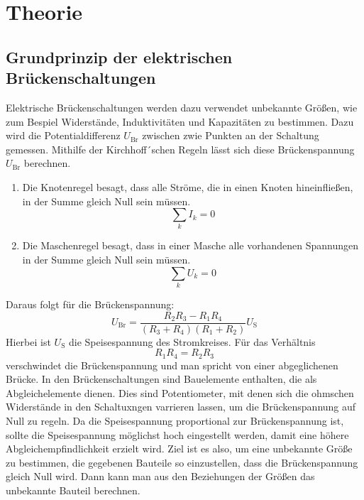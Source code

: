 \section{Theorie} \label{sec:Theorie}

\subsection{Grundprinzip der elektrischen Brückenschaltungen}

   Elektrische Brückenschaltungen werden dazu verwendet unbekannte Größen, wie zum Bespiel Widerstände, Induktivitäten und
   Kapazitäten zu bestimmen.
   Dazu wird die Potentialdifferenz $U_\text{Br}$ zwischen zwie Punkten an der Schaltung gemessen.
   Mithilfe der Kirchhoff´schen Regeln lässt sich diese Brückenspannung $U_\text{Br}$ berechnen.
   \begin{enumerate}
       \item Die Knotenregel besagt, dass alle Ströme, die in einen Knoten hineinfließen, in der Summe gleich Null sein müssen.
       \begin{equation}
           \sum_k I_k = 0
       \end{equation}
       \item Die Maschenregel besagt, dass in einer Masche alle vorhandenen Spannungen in der Summe gleich Null sein müssen.
       \begin{equation}
           \sum_k U_k = 0
       \end{equation}
   \end{enumerate}
   Daraus folgt für die Brückenspannung:
   \begin{equation}
       U_\text{Br} = \frac{R_2R_3 - R_1R_4}{(R_3 + R_4)(R_1 + R_2)} U_\text{S}
   \end{equation}
   Hierbei ist $U_\text{S}$ die Speisespannung des Stromkreises.
   Für das Verhältnis
   \begin{equation}
       R_1R_4 = R_2R_3 \label{eqn: Widerstände}
   \end{equation}
   verschwindet die Brückenspannung und man spricht von einer abgeglichenen Brücke.
   In den Brückenschaltungen sind Bauelemente enthalten, die als Abgleichelemente dienen.
   Dies sind Potentiometer, mit denen sich die ohmschen Widerstände in den Schaltuxngen varrieren lassen, um
   die Brückenspannung auf Null zu regeln.
   Da die Speisespannung proportional zur Brückenspannung ist, sollte die Speisespannung möglichst hoch eingestellt werden,
   damit eine höhere Abgleichempfindlichkeit erzielt wird.
   Ziel ist es also, um eine unbekannte Größe zu bestimmen, die gegebenen Bauteile so einzustellen, dass
   die Brückenspannung gleich Null wird. Dann kann man aus den Beziehungen der Größen das unbekannte Bauteil berechnen. %

